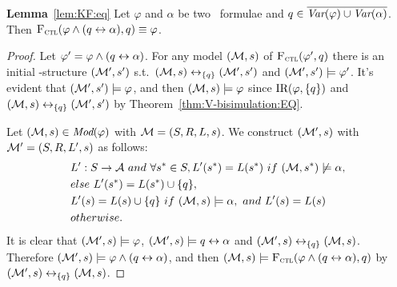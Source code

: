\documentclass{article}
\begin{document}
  \noindent \textbf{Lemma}~\ref{lem:KF:eq} Let $\varphi$ and $\alpha$ be two \CTL\ formulae and $q\in
 		\overline{\textit{Var}(\varphi) \cup \textit{Var}(\alpha)}$. Then
 	${\textsc{F}_{\textsc{ctl}}}(\varphi \wedge (q\leftrightarrow\alpha), q)\equiv \varphi$.\\
     \begin{proof}
 	Let $\varphi' =\varphi \wedge (q\leftrightarrow\alpha)$. For any model $({\cal M},s)$ of ${\textsc{F}_{\textsc{ctl}}}(\varphi', q)$ there is an initial \MPK-structure $({\cal M}',s')$ s.t.\ $({\cal M},s)\leftrightarrow_{\{q\}}({\cal M}',s')$ and $({\cal M}',s') \models \varphi'$. It's evident that $({\cal M}',s') \models \varphi$, and then $({\cal M},s) \models \varphi$ since $\textrm{IR}(\varphi,\{q\})$ and $({\cal M},s)\leftrightarrow_{\{q\}}({\cal M}',s')$
 	by Theorem~\ref{thm:V-bisimulation:EQ}.

 	Let $({\cal M},s) \in \textit{Mod}(\varphi)$ with ${\cal M}=(S, R, L,s)$. We construct $({\cal M}', s)$ with ${\cal M}' = (S, R, L',s)$ as follows:
     \begin{align*}
       & L':S \rto \Ha\ and\ \forall s^*\in S, L'(s^*) = L(s^*)\ if\ (\Hm, s^*) \not \models \alpha,\\
       & else\ L'(s^*) = L(s^*)\cup\{q\}, \\
       & L'(s) = L(s) \cup\{q\}\ if\ (\Hm, s) \models \alpha,\ and\ L'(s) = L(s)\\
       & otherwise.
     \end{align*}
 	It is clear that $({\cal M}',s) \models \varphi$, $({\cal M}',s) \models q\leftrightarrow \alpha$ and
 	$({\cal M}', s) \leftrightarrow_{\{q\}} ({\cal M}, s)$. Therefore $({\cal M}', s) \models \varphi \wedge (q\leftrightarrow\alpha)$, and then $({\cal M}, s) \models {\textsc{F}_{\textsc{ctl}}} (\varphi \wedge (q\leftrightarrow\alpha), q)$ by
 	$({\cal M}', s) \leftrightarrow_{\{q\}} ({\cal M}, s)$.
 \end{proof}
\end{document}
